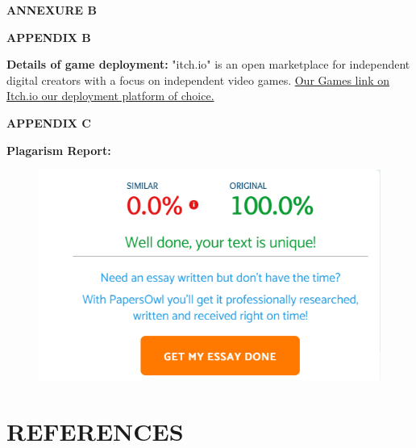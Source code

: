 \documentclass[12pt]{report}
\begin{document}
\newpage
\centering
\Large\textbf{ANNEXURE B}

\centering

\Large\textbf{APPENDIX B}\\
\justifying
\setlength{\parindent}{4em}
\setlength{\parskip}{0.5em}
\renewcommand{\baselinestretch}{1.5}
\normalsize
\raggedright\textbf{Details of game deployment:} "itch.io" is an open marketplace for independent digital creators with a focus on independent video games.
\href{https://sharanthakur.itch.io/infinite-pleasure-dodgeball}{Our Games link on Itch.io our deployment platform of choice.}

\vspace{1cm}


\vspace{0.1cm} 






\vspace{15 cm}

\clearpage

\centering

\Large\textbf{APPENDIX C}\\
\justifying
\setlength{\parindent}{4em}
\setlength{\parskip}{0.5em}
\renewcommand{\baselinestretch}{1.5}
\large
\raggedright\textbf{Plagarism Report:}
\vspace{1cm}

\begin{figure}[h]
\centering
\includegraphics[scale=0.9]{image32.png}

\end{figure}
\vspace{15 cm}


\centering
\section{REFERENCES}
\end{document}
